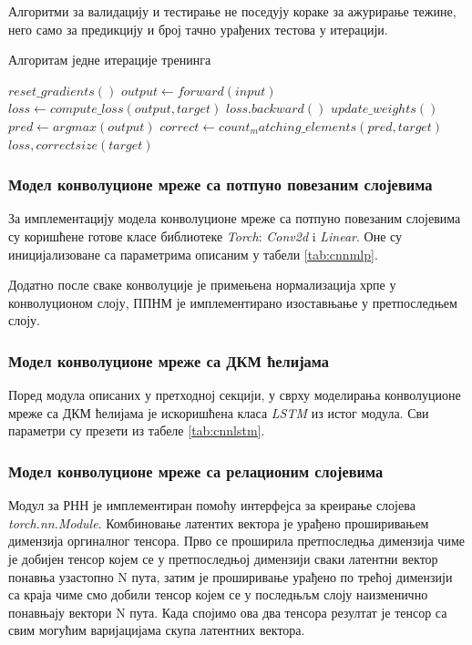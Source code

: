 \documentclass[a4paper, 12pt, master, utf8]{etf}
\begin{document}
Алгоритми за валидацију и тестирање не поседују кораке за ажурирање тежине, него само за предикцију и број тачно урађених тестова у итерацији.


\begin{algorithm}[h]
    \caption{Алгоритам једне итерације тренинга}
    \label{alg3}
    \begin{algorithmic}[1]
        \State $ reset\_gradients()$
        \State $output \gets forward(input)$
        \State $loss \gets compute\_loss(output, target)$
        \State $loss.backward()$
        \State $update\_weights()$
        \State $pred \gets argmax(output)$
        \State $correct \gets count_matching\_elements(pred, target)$
        \State \Return $loss, correct size(target)$
    \EndProcedure
    \end{algorithmic}
    \end{algorithm}

\subsubsection{Модел конволуционе мреже са потпуно повезаним слојевима} 
За имплементацију модела конволуционе мреже са потпуно повезаним слојевима су коришћене готове класе библиотеке 
\textit{Torch}: \textit{Conv2d} i \textit{Linear}. Оне су иницијализоване са параметрима описаним у табели \ref{tab:cnnmlp}.

Додатно после сваке конволуције је примењена нормализација хрпе у конволуционом слоју, ППНМ је имплементирано изоставњање у претпоследњем слоју.

\subsubsection{Модел конволуционе мреже са ДКМ ћелијама}
Поред модула описаних у претходној секцији, у сврху моделирања конволуционе мреже са ДКМ ћелијама је искоришћена класа \textit{LSTM} из истог модула.
Сви параметри су презети из табеле \ref{tab:cnnlstm}.

\subsubsection{Модел конволуционе мреже са релационим слојевима}

Модул за РНН је имплементиран помоћу интерфејса за креирање слојева \textit{torch.nn.Module}. 
Комбиновање латентих вектора је урађено проширивањем димензија оргиналног тенсора. Прво се проширила претпоследња димензија чиме
је добијен тенсор којем се у претпоследњој димензији сваки латентни вектор понавња узастопно N пута, затим је проширивање урађено 
по трећој димензији са краја чиме смо добили тенсор којем се у последњљм слоју наизменично понавњају вектори N пута. Када спојимо 
ова два тенсора резултат је тенсор са свим могућим варијацијама скупа латентних вектора.
\end{document}
